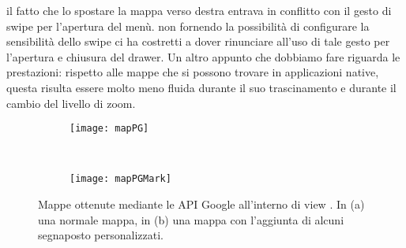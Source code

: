             il fatto che lo spostare la mappa verso destra entrava in conflitto
            con il gesto di swipe per l'apertura del menù. \kendomob{} non
            fornendo la possibilità di configurare la sensibilità dello swipe ci
            ha costretti a dover rinunciare all'uso di tale gesto per l'apertura
            e chiusura del drawer. Un altro appunto che dobbiamo fare riguarda
            le prestazioni: rispetto alle mappe che si possono trovare in
            applicazioni native, questa risulta essere molto meno fluida durante
            il suo trascinamento e durante il cambio del livello di zoom.
            \begin{figure}[h]
                \centering
                \begin{subfigure}[b]{0.485\textwidth}
                    \texttt{[image: mapPG]}
                    \caption{}
                    \label{fig:mapPG}
                \end{subfigure}
                ~
                \begin{subfigure}[b]{0.485\textwidth}
                    \texttt{[image: mapPGMark]}
                    \caption{}
                    \label{fig:mapPGMark}
                \end{subfigure}
                \caption{
                    Mappe ottenute mediante le API Google all'interno di
                    view \kendomob{}. In (a) una normale mappa, in
                    (b) una mappa con l'aggiunta di alcuni
                    segnaposto personalizzati.
                }
                \label{fig:PGMaps}
            \end{figure}

